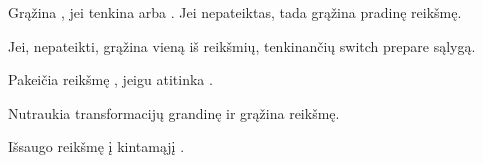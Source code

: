 \documentclass[letterpaper,10pt,lithuanian]{sphinxmanual}
\begin{document}
\begin{fulllineitems}

\begin{fulllineitems}
\label{\detokenize{formules:id7}}
\pysigstartsignatures
{}
\pysigstopsignatures
\sphinxAtStartPar
Grąžina , jei tenkina  arba . Jei 
nepateiktas, tada grąžina pradinę reikšmę.

\sphinxAtStartPar
Jei,  nepateikti, grąžina vieną iš 
reikšmių, tenkinančių switch prepare sąlygą.

\end{fulllineitems}


\begin{fulllineitems}
\label{\detokenize{formules:func.swap}}
\pysigstartsignatures
{}
\pysigstopsignatures
\sphinxAtStartPar
Pakeičia  reikšmę , jeigu  atitinka .

\end{fulllineitems}


\begin{fulllineitems}
\label{\detokenize{formules:func.return}}
\pysigstartsignatures
{}
\pysigstopsignatures
\sphinxAtStartPar
Nutraukia transformacijų grandinę ir grąžina reikšmę.

\end{fulllineitems}


\begin{fulllineitems}
\label{\detokenize{formules:id8}}
\pysigstartsignatures
{}
\pysigstopsignatures
\sphinxAtStartPar
Išsaugo reikšmę į kintamąjį .


\end{fulllineitems}
\end{fulllineitems}
\end{document}
